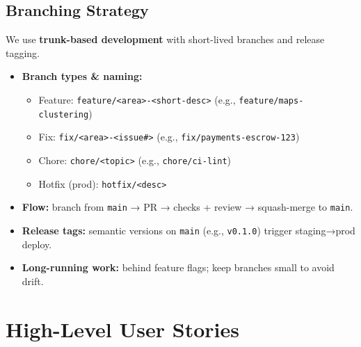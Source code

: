 \documentclass[11pt]{article}
\begin{document}
\subsection*{Branching Strategy}
We use \textbf{trunk-based development} with short-lived branches and release tagging.
\begin{itemize}[leftmargin=1.4em]
  \item \textbf{Branch types \& naming:}
    \begin{itemize}
      \item Feature: \texttt{feature/<area>-<short-desc>} (e.g., \texttt{feature/maps-clustering})
      \item Fix: \texttt{fix/<area>-<issue\#>} (e.g., \texttt{fix/payments-escrow-123})
      \item Chore: \texttt{chore/<topic>} (e.g., \texttt{chore/ci-lint})
      \item Hotfix (prod): \texttt{hotfix/<desc>}
    \end{itemize}
  \item \textbf{Flow:} branch from \texttt{main} → PR → checks + review → squash-merge to \texttt{main}.
  \item \textbf{Release tags:} semantic versions on \texttt{main} (e.g., \texttt{v0.1.0}) trigger staging→prod deploy.
  \item \textbf{Long-running work:} behind feature flags; keep branches small to avoid drift.
\end{itemize}

\section{High-Level User Stories}
\end{document}
